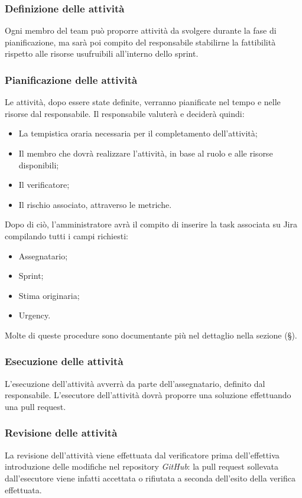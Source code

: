 \documentclass[10pt, a4paper]{article}
\begin{document}
\subsubsection{Definizione delle attività}
Ogni membro del team può proporre attività da svolgere durante la fase di pianificazione, ma sarà poi compito del responsabile stabilirne la fattibilità rispetto alle risorse usufruibili all'interno dello sprint.
\subsubsection{Pianificazione delle attività}
Le attività, dopo essere state definite, verranno pianificate nel tempo e nelle risorse dal responsabile. Il responsabile valuterà e deciderà quindi:
\begin{itemize}
    \item La tempistica oraria necessaria per il completamento dell'attività;
    \item Il membro che dovrà realizzare l'attività, in base al ruolo e alle risorse disponibili;
    \item Il verificatore;
    \item Il rischio associato, attraverso le metriche.
\end{itemize}
Dopo di ciò, l'amministratore avrà il compito di inserire la task associata su Jira compilando tutti i campi richiesti:
\begin{itemize}
    \item Assegnatario;
    \item Sprint;
    \item Stima originaria;
    \item Urgency.
\end{itemize}
Molte di queste procedure sono documentante più nel dettaglio nella sezione (\S {}).
\subsubsection{Esecuzione delle attività}
L'esecuzione dell'attività avverrà da parte dell'assegnatario, definito dal responsabile. L'esecutore dell'attività dovrà proporre una soluzione effettuando una pull request.
\subsubsection{Revisione delle attività}
La revisione dell'attività viene effettuata dal verificatore prima dell'effettiva introduzione delle modifiche nel repository \textit{GitHub}: la pull request sollevata dall'esecutore viene infatti accettata o rifiutata a seconda dell'esito della verifica effettuata.
\end{document}
